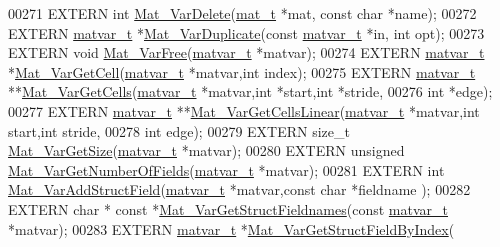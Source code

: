 \begin{DoxyCode}
00271 EXTERN \textcolor{keywordtype}{int}        \hyperlink{group___m_a_t_gabf139e48d48177e5069338fa2919c60a}{Mat\_VarDelete}(\hyperlink{struct__mat__t}{mat\_t} *mat, \textcolor{keyword}{const} \textcolor{keywordtype}{char} *name);
00272 EXTERN \hyperlink{group___m_a_t_structmatvar__t}{matvar\_t}  *\hyperlink{group___m_a_t_ga7ef80c5d99d7918b2b09db3bea106ecc}{Mat\_VarDuplicate}(\textcolor{keyword}{const} \hyperlink{group___m_a_t_structmatvar__t}{matvar\_t} *in, \textcolor{keywordtype}{int} opt);
00273 EXTERN \textcolor{keywordtype}{void}       \hyperlink{group___m_a_t_ga1d14716f7450530fd1c9d02413787f0e}{Mat\_VarFree}(\hyperlink{group___m_a_t_structmatvar__t}{matvar\_t} *matvar);
00274 EXTERN \hyperlink{group___m_a_t_structmatvar__t}{matvar\_t}  *\hyperlink{group___m_a_t_gac1e15063439c0bd3eb0c986514c742dc}{Mat\_VarGetCell}(\hyperlink{group___m_a_t_structmatvar__t}{matvar\_t} *matvar,\textcolor{keywordtype}{int} index);
00275 EXTERN \hyperlink{group___m_a_t_structmatvar__t}{matvar\_t} **\hyperlink{group___m_a_t_ga0732b0a6c40975b036068b9a14422d45}{Mat\_VarGetCells}(\hyperlink{group___m_a_t_structmatvar__t}{matvar\_t} *matvar,\textcolor{keywordtype}{int} *start,\textcolor{keywordtype}{int} *stride,
00276                       \textcolor{keywordtype}{int} *edge);
00277 EXTERN \hyperlink{group___m_a_t_structmatvar__t}{matvar\_t} **\hyperlink{group___m_a_t_ga004987d665654409f74eaf8e82bb1380}{Mat\_VarGetCellsLinear}(\hyperlink{group___m_a_t_structmatvar__t}{matvar\_t} *matvar,\textcolor{keywordtype}{int} start,\textcolor{keywordtype}{int}
       stride,
00278                       \textcolor{keywordtype}{int} edge);
00279 EXTERN \textcolor{keywordtype}{size\_t}     \hyperlink{group___m_a_t_gaeeb798fead2f765bddfb19016c7fdbcc}{Mat\_VarGetSize}(\hyperlink{group___m_a_t_structmatvar__t}{matvar\_t} *matvar);
00280 EXTERN \textcolor{keywordtype}{unsigned}   \hyperlink{group___m_a_t_ga06ba20aa758543d53dc83a1ccbdc2efc}{Mat\_VarGetNumberOfFields}(\hyperlink{group___m_a_t_structmatvar__t}{matvar\_t} *matvar);
00281 EXTERN \textcolor{keywordtype}{int}        \hyperlink{group___m_a_t_gaef5689cace7c4165c3cbf8fa17d1ebcd}{Mat\_VarAddStructField}(\hyperlink{group___m_a_t_structmatvar__t}{matvar\_t} *matvar,\textcolor{keyword}{const} \textcolor{keywordtype}{char} *fieldname
      );
00282 EXTERN \textcolor{keywordtype}{char} * \textcolor{keyword}{const} *\hyperlink{group___m_a_t_ga88bc328e59ce1dd8f43e917c07140803}{Mat\_VarGetStructFieldnames}(\textcolor{keyword}{const} 
      \hyperlink{group___m_a_t_structmatvar__t}{matvar\_t} *matvar);
00283 EXTERN \hyperlink{group___m_a_t_structmatvar__t}{matvar\_t}  *\hyperlink{group___m_a_t_ga03ab2d89f683f9ccb4785fb255b14e0b}{Mat\_VarGetStructFieldByIndex}(

\end{DoxyCode}
